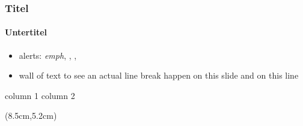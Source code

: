 \begin{frame}
  \frametitle{Titel}
  \framesubtitle{Untertitel}

  \begin{itemize}
  \item alerts: \emph{emph}, , , 
  \item wall of text to see an actual line break happen on this slide and on this line
  \end{itemize}

	\bigskip
	\bigskip
	\pause  

  \begin{KITcolumns}
  column 1
  column 2
  \end{KITcolumns}

  \begin{textblock*}{0.5\linewidth}(8.5cm,5.2cm)
  \end{textblock*}
  
\end{frame}